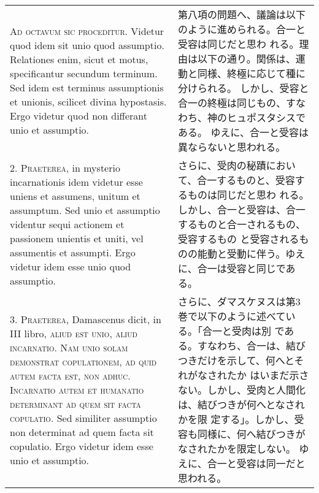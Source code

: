 \documentclass[10pt]{jsarticle} %
\begin{document}
\begin{longtable}{p{21em}p{21em}}




{\Huge A}{\scshape d octavum sic proceditur}. Videtur quod idem sit
unio quod assumptio. Relationes enim, sicut et motus, specificantur
secundum terminum. Sed idem est terminus assumptionis et unionis,
scilicet divina hypostasis. Ergo videtur quod non differant unio et
assumptio.


&

第八項の問題へ、議論は以下のように進められる。合一と受容は同じだと思わ
れる。理由は以下の通り。関係は、運動と同様、終極に応じて種に分けられる。
しかし、受容と合一の終極は同じもの、すなわち、神のヒュポスタシスである。
ゆえに、合一と受容は異ならないと思われる。


\\



2. {\scshape Praeterea}, in mysterio incarnationis idem videtur esse
uniens et assumens, unitum et assumptum. Sed unio et assumptio
videntur sequi actionem et passionem unientis et uniti, vel assumentis
et assumpti. Ergo videtur idem esse unio quod assumptio.


&


さらに、受肉の秘蹟において、合一するものと、受容するものは同じだと思わ
れる。しかし、合一と受容は、合一するものと合一されるもの、受容するもの
と受容されるものの能動と受動に伴う。ゆえに、合一は受容と同じである。

\\



3. {\scshape Praeterea}, Damascenus dicit, in III libro, {\scshape
aliud est unio, aliud incarnatio. Nam unio solam demonstrat
copulationem, ad quid autem facta est, non adhuc. Incarnatio autem et
humanatio determinant ad quem sit facta copulatio}. Sed similiter
assumptio non determinat ad quem facta sit copulatio. Ergo videtur
idem esse unio et assumptio.


&


さらに、ダマスケヌスは第3巻で以下のように述べている。「合一と受肉は別
である。すなわち、合一は、結びつきだけを示して、何へとそれがなされたか
はいまだ示さない。しかし、受肉と人間化は、結びつきが何へとなされかを限
定する」。しかし、受容も同様に、何へ結びつきがなされたかを限定しない。
ゆえに、合一と受容は同一だと思われる。

\\




\end{longtable}
\end{document}
